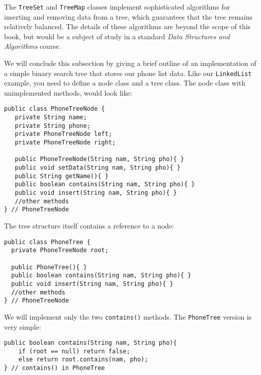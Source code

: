 The {\tt TreeSet} and {\tt TreeMap} classes implement sophisticated
algorithms for inserting and removing data from a tree, which
guarantees that the tree remains relatively balanced. The details of
these algorithms are beyond the scope of this book, but would be a
subject of study in a standard {\em Data Structures and Algorithms}
course.

We will conclude this subsection by giving a brief outline of an
implementation of a simple binary search tree that stores our phone
list data.  Like our {\tt LinkedList} example, you need to define a
node class and a tree class.  The node class with unimplemented
methods, would look like:

\begin{jjjlisting}
\begin{lstlisting}
public class PhoneTreeNode {
   private String name;
   private String phone;
   private PhoneTreeNode left;
   private PhoneTreeNode right;

   public PhoneTreeNode(String nam, String pho){ }
   public void setData(String nam, String pho){ }
   public String getName(){ }
   public boolean contains(String nam, String pho){ }
   public void insert(String nam, String pho){ }
   //other methods
} // PhoneTreeNode
\end{lstlisting}
\end{jjjlisting}

\noindent The tree structure itself contains a reference to a node:

\begin{jjjlisting}
\begin{lstlisting}
public class PhoneTree {
  private PhoneTreeNode root;

  public PhoneTree(){ }
  public boolean contains(String nam, String pho){ }
  public void insert(String nam, String pho){ }
  //other methods
} // PhoneTreeNode
\end{lstlisting}
\end{jjjlisting}

\noindent We will implement only the two {\tt contains()} methods.
The {\tt PhoneTree} version is very simple:

\begin{jjjlisting}
\begin{lstlisting}
public boolean contains(String nam, String pho){
    if (root == null) return false;
    else return root.contains(nam, pho);
} // contains() in PhoneTree
\end{lstlisting}
\end{jjjlisting}

